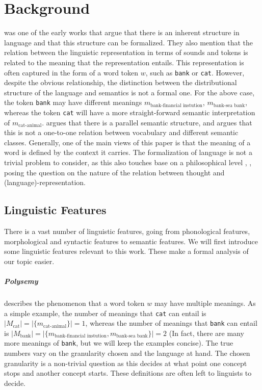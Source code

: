 \documentclass[a4paper,12pt,oneside,openright]{report}
\begin{document}
\chapter{Background}\label{section:Background} 

\cite{harris54} was one of the early works that argue that there is an inherent structure in language and that this structure can be formalized.
They also mention that the relation between the linguistic representation in terms of sounds and tokens is related to the meaning that the representation entails. 
This representation is often captured in the form of a word token $w$, such as \Verb#bank# or \Verb#cat#.
However, despite the obvious relationship, the distinction between the distributional structure of the language and semantics is not a formal one. 
For the above case, the token \Verb#bank# may have different meanings $m_\text{bank-financial instution}$, $m_\text{bank-sea bank}$, whereas the token \Verb#cat# will have a more straight-forward semantic interpretation of $m_\text{cat-animal}$.
\cite{harris54} argues that there is a parallel semantic structure, and argues that this is not a one-to-one relation between vocabulary and different semantic classes.
Generally, one of the main views of this paper is that the meaning of a word is defined by the context it carries.
The formalization of language is not a trivial problem to consider, as this also touches base on a philosophical level \cite{hegel17}, \cite{wittgenstein53}, posing the question on the nature of the relation between thought and (language)-representation.

\section{Linguistic Features}

There is a vast number of linguistic features, going from phonological features, morphological and syntactic features to semantic features.
We will first introduce some linguistic features relevant to this work.
These make a formal analysis of our topic easier.

\paragraph{Polysemy} describes the phenomenon that a word token $w$ may have multiple meanings.
As a simple example, the number of meanings that \Verb#cat# can entail is $ | M_\text{cat} | = | \{ m_\text{cat-animal} \} |  = 1$, whereas the number of meanings that \Verb#bank# can entail is $ | M_\text{bank} | = | \{ m_\text{bank-financial instution},  m_\text{bank-sea bank}\} |  = 2$ (In fact, there are many more meanings of \texttt{bank}, but we will keep the examples concise).
The true numbers vary on the granularity chosen and the language at hand. 
The chosen granularity is a non-trivial question as this decides at what point one concept stops and another concept starts.
These definitions are often left to linguists to decide. \\
\end{document}
